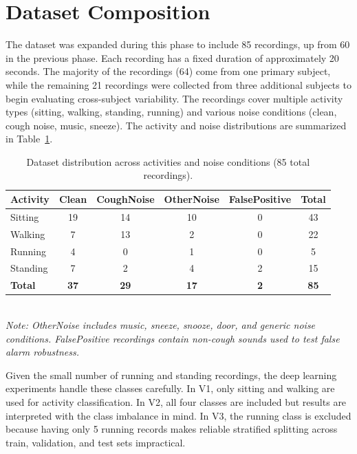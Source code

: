 \section{Dataset Composition}

The dataset was expanded during this phase to include 85 recordings, up from 60 in the previous phase. Each recording has a fixed duration of approximately 20 seconds. The majority of the recordings (64) come from one primary subject, while the remaining 21 recordings were collected from three additional subjects to begin evaluating cross-subject variability. The recordings cover multiple activity types (sitting, walking, standing, running) and various noise conditions (clean, cough noise, music, sneeze). The activity and noise distributions are summarized in Table~\ref{tab:dataset_dist}.

\begin{table}[H]
\centering
\caption{Dataset distribution across activities and noise conditions (85 total recordings).}
\label{tab:dataset_dist}
\begin{tabular}{@{}lcccc|c@{}}
\toprule
\textbf{Activity} & \textbf{Clean} & \textbf{CoughNoise} & \textbf{OtherNoise} & \textbf{FalsePositive} & \textbf{Total} \\
\midrule
Sitting    & 19 & 14 & 10 & 0 & 43 \\
Walking    & 7  & 13 & 2  & 0 & 22 \\
Running    & 4  & 0  & 1  & 0 & 5  \\
Standing   & 7  & 2  & 4  & 2 & 15 \\
\midrule
\textbf{Total} & \textbf{37} & \textbf{29} & \textbf{17} & \textbf{2} & \textbf{85} \\
\bottomrule
\end{tabular}
\\[4pt]
\footnotesize\textit{Note: OtherNoise includes music, sneeze, snooze, door, and generic noise conditions. FalsePositive recordings contain non-cough sounds used to test false alarm robustness.}
\end{table}

Given the small number of running and standing recordings, the deep learning experiments handle these classes carefully. In V1, only sitting and walking are used for activity classification. In V2, all four classes are included but results are interpreted with the class imbalance in mind. In V3, the running class is excluded because having only 5 running records makes reliable stratified splitting across train, validation, and test sets impractical.

